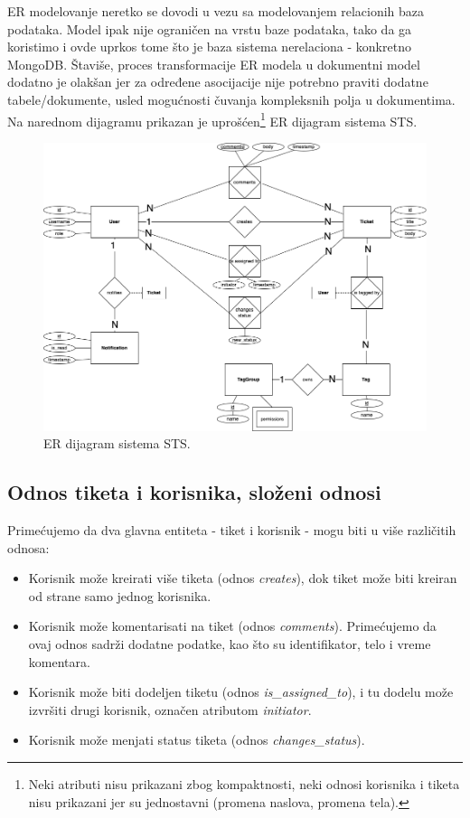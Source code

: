 \documentclass[12pt,oneside]{memoir}
\begin{document}
ER modelovanje neretko se dovodi u vezu sa modelovanjem relacionih baza podataka. Model ipak nije ograničen na vrstu baze podataka, tako da ga koristimo i ovde  uprkos tome što je baza sistema nerelaciona - konkretno MongoDB. Štaviše, proces transformacije ER modela u dokumentni model dodatno je olakšan jer za određene asocijacije nije potrebno praviti dodatne tabele/dokumente, usled mogućnosti čuvanja kompleksnih polja u dokumentima. Na narednom dijagramu prikazan je uprošćen\footnote{Neki atributi nisu prikazani zbog kompaktnosti, neki odnosi korisnika i tiketa nisu prikazani jer su jednostavni (promena naslova, promena tela).} ER dijagram sistema STS.

\begin{figure}[h]
  \centering
  \includegraphics[width=1\textwidth]{docs/images/ch_1/rdiagram.png} 
  \caption{ER dijagram sistema STS.}
\end{figure}

\newpage
\subsection{Odnos tiketa i korisnika, složeni odnosi}
Primećujemo da dva glavna entiteta - tiket i korisnik - mogu biti u više različitih odnosa:
\begin{itemize}
    \item Korisnik može kreirati više tiketa (odnos \textit{creates}), dok tiket može biti kreiran od strane samo jednog korisnika.
    \item Korisnik može komentarisati na tiket (odnos \textit{comments}). Primećujemo da ovaj odnos sadrži dodatne podatke, kao što su identifikator, telo i vreme komentara.
    \item Korisnik može biti dodeljen tiketu (odnos \textit{is\_assigned\_to}), i tu dodelu može izvršiti drugi korisnik, označen atributom \textit{initiator}.
    \item Korisnik može menjati status tiketa (odnos \textit{changes\_status}).
\end{itemize}
\end{document}
